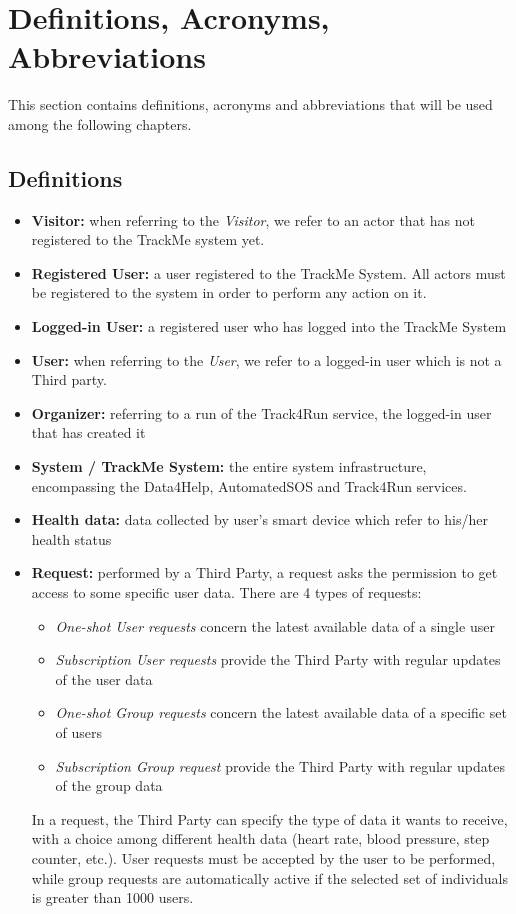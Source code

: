 \section{Definitions, Acronyms, Abbreviations}
This section contains definitions, acronyms and abbreviations that will be used among the following chapters.

\subsection{Definitions}

\begin{itemize}

\item \textbf{Visitor:} when referring to the \emph{Visitor}, we refer to an actor that has not registered to the TrackMe system yet.

\item \textbf{Registered User:} a user registered to the TrackMe System. All actors must be registered to the system in order to perform any action on it.

\item\textbf{Logged-in User:} a registered user who has logged into the TrackMe System

\item \textbf{User:} when referring to the \emph{User}, we refer to a logged-in user which is not a Third party. 

\item\textbf{Organizer:} referring to a run of the Track4Run service, the logged-in user that has created it

\item \textbf{System / TrackMe System:} the entire system infrastructure, encompassing the Data4Help, AutomatedSOS and Track4Run services.

\item\textbf{Health data:} data collected by user's smart device which refer to his/her health status

\item\textbf{Request:} performed by a Third Party, a request asks the permission to get access to some specific user data.
There are 4 types of requests: 
\begin{itemize}
\item \textit{One-shot User requests} concern the latest available data of a single user
\item \textit{Subscription User requests} provide the Third Party with regular updates of the user data
\item \textit{One-shot Group requests} concern the latest available data of a specific set of users
\item \textit{Subscription Group request} provide the Third Party with regular updates of the group data
\end{itemize}
In a request, the Third Party can specify the type of data it wants to receive, with a choice among different health data (heart rate, blood pressure, step counter, etc.). User requests must be accepted by the user to be performed, while group requests are automatically active if the selected set of individuals is greater than 1000 users.


\end{itemize}
